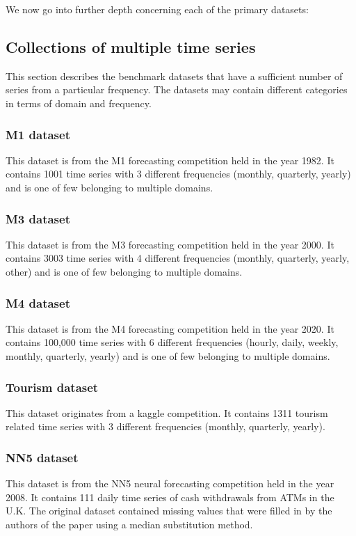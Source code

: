 \documentclass{article}
\begin{document}
We now go into further depth concerning each of the primary datasets:

\subsection{Collections of multiple time series}
This section describes the benchmark datasets that have a sufficient number of series from a particular
frequency. The datasets may contain different categories in terms of domain and frequency.

\subsubsection{M1 dataset}
This dataset is from the M1 forecasting competition held in the year 1982. It contains 1001 time series with 3 different frequencies (monthly, quarterly, yearly) and is one of few belonging to multiple domains.

\subsubsection{M3 dataset}
This dataset is from the M3 forecasting competition held in the year 2000. It contains 3003 time series with 4 different frequencies (monthly, quarterly, yearly, other) and is one of few belonging to multiple domains.

\subsubsection{M4 dataset}
This dataset is from the M4 forecasting competition held in the year 2020. It contains 100,000 time series with 6 different frequencies (hourly, daily, weekly, monthly, quarterly, yearly) and is one of few belonging to multiple domains.

\subsubsection{Tourism dataset}
This dataset originates from a kaggle competition. It contains 1311 tourism related time series with 3 different frequencies (monthly, quarterly, yearly).

\subsubsection{NN5 dataset}
This dataset is from the NN5 neural forecasting competition held in the year 2008. It contains 111 daily time series of cash withdrawals from ATMs in the U.K. The original dataset contained missing values that were filled in by the authors of the paper using a median substitution method.
\end{document}
